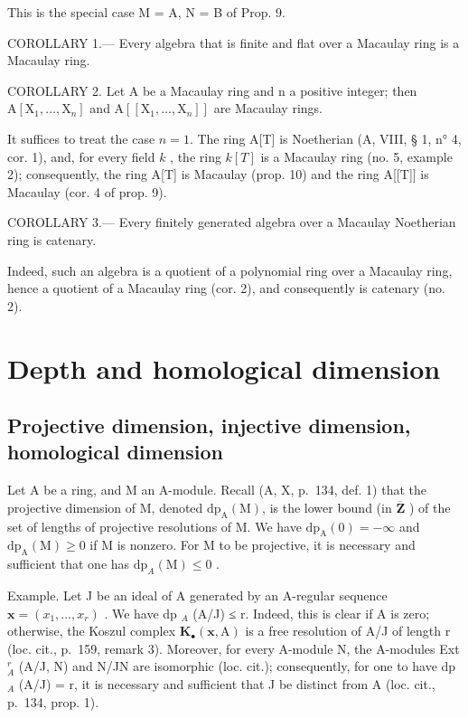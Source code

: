 This is the special case M = A, N = B of Prop. 9.

COROLLARY 1.--- Every algebra that is finite and flat over a Macaulay ring is a Macaulay ring.

COROLLARY 2. Let A be a Macaulay ring and n a positive integer; then \(\mathrm{A}[\mathrm{X}_1,\dots ,\mathrm{X}_n]\) and \(\mathrm{A}[[\mathrm{X}_1,\dots ,\mathrm{X}_n]]\) are Macaulay rings.

It suffices to treat the case \(n = 1\). The ring A{[}T{]} is Noetherian (A, VIII, § 1, n° 4, cor. 1), and, for every field \(k\) , the ring \(k[T]\) is a Macaulay ring (no. 5, example 2); consequently, the ring A{[}T{]} is Macaulay (prop. 10) and the ring A{[}{[}T{]}{]} is Macaulay (cor. 4 of prop. 9).

COROLLARY 3.--- Every finitely generated algebra over a Macaulay Noetherian ring is catenary.

Indeed, such an algebra is a quotient of a polynomial ring over a Macaulay ring, hence a quotient of a Macaulay ring (cor. 2), and consequently is catenary (no. 2).

\section{Depth and homological dimension}

\subsection{Projective dimension, injective dimension, homological dimension}

Let A be a ring, and M an A-module. Recall (A, X, p.~134, def. 1) that the projective dimension of M, denoted \(\mathrm{dp}_{\mathrm{A}}(\mathrm{M})\), is the lower bound (in \(\overline{\mathbf{Z}}\) ) of the set of lengths of projective resolutions of M. We have \(\mathrm{dp}_{\mathrm{A}}(0) = -\infty\) and \(\mathrm{dp}_{\mathrm{A}}(\mathrm{M}) \geqslant 0\) if M is nonzero. For M to be projective, it is necessary and sufficient that one has \(\mathrm{dp}_{A}(\mathrm{M}) \leqslant 0\) .

Example. Let J be an ideal of A generated by an A-regular sequence \(\mathbf{x} = (x_{1}, \ldots, x_{r})\) . We have dp \(_{A}\) (A/J) ≤ r. Indeed, this is clear if A is zero; otherwise, the Koszul complex \(\mathbf{K}_{\bullet}(\mathbf{x}, \mathrm{A})\) is a free resolution of A/J of length r (loc. cit., p.~159, remark 3). Moreover, for every A-module N, the A-modules Ext \(_{A}^{r}\) (A/J, N) and N/JN are isomorphic (loc. cit.); consequently, for one to have dp \(_{A}\) (A/J) = r, it is necessary and sufficient that J be distinct from A (loc. cit., p.~134, prop. 1).

